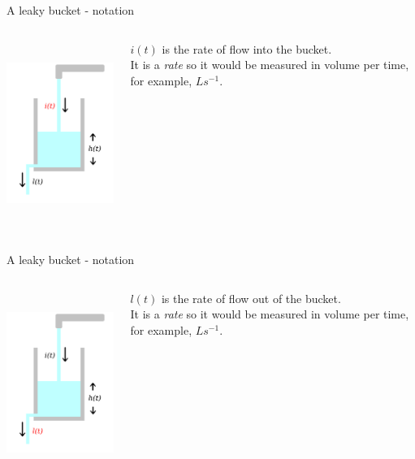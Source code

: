 \documentclass{beamer}
\newcommand{\crish}{\color{reddish}}
\newcommand{\cbla}{\color{black}}
\newcommand{\cred}{\color{red}}
\begin{document}
\begin{frame}{A leaky bucket - notation}
\begin{columns}
\begin{column}{0.5\textwidth}
  \begin{center}
     \includegraphics[height=6cm]{glass_i_red.png}      
     \end{center}
\end{column}
\begin{column}{0.5\textwidth}
  \cred{} $i(t)$\color{black}{} is the rate of flow into the
  bucket.\\[1cm] It is a \textsl{rate} so it would be measured in
  volume per time, for example, \crish$Ls^{-1}$\cbla.
\end{column}
\end{columns}
\end{frame}


\begin{frame}{A leaky bucket - notation}
\begin{columns}
\begin{column}{0.5\textwidth}
  \begin{center}
     \includegraphics[height=6cm]{glass_l_red.png}      
     \end{center}
\end{column}
\begin{column}{0.5\textwidth}
  \cred{} $l(t)$\color{black}{} is the rate of flow out of the
  bucket.\\[1cm] It is a \textsl{rate} so it would be measured in
  volume per time, for example, \crish$Ls^{-1}$\cbla.
  
\end{column}
\end{columns}
\end{frame}
\end{document}
